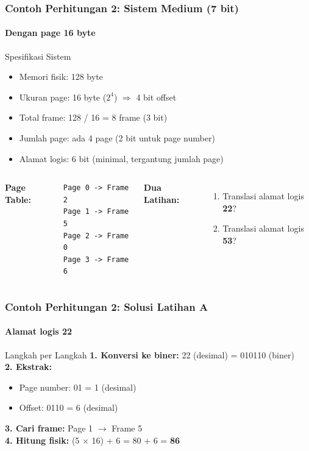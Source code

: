 \documentclass[t,aspectratio=169,xcolor=dvipsnames]{beamer}
\begin{document}
\begin{frame}[fragile]
    \frametitle{Contoh Perhitungan 2: Sistem Medium (7 bit)}
    \framesubtitle{Dengan page 16 byte}
    \scriptsize

    \begin{block}{Spesifikasi Sistem}
        \begin{itemize}
            \item Memori fisik: 128 byte
            \item Ukuran page: 16 byte ($2^4$) $\Rightarrow$ 4 bit offset
            \item Total frame: 128 / 16 = 8 frame (3 bit)
            \item Jumlah page: ada 4 page (2 bit untuk page number)
            \item Alamat logis: 6 bit (minimal, tergantung jumlah page)
        \end{itemize}
    \end{block}

    \vspace{0.2cm}
    \begin{columns}[T]
        \textbf{Page Table:}
        \begin{lstlisting}[basicstyle=\ttfamily\footnotesize,breaklines=true]
Page 0 -> Frame 2
Page 1 -> Frame 5
Page 2 -> Frame 0
Page 3 -> Frame 6
        \end{lstlisting}

        \textbf{Dua Latihan:}
        \begin{enumerate}
            \item Translasi alamat logis \textbf{22}?
            \item Translasi alamat logis \textbf{53}?
        \end{enumerate}
    \end{columns}
\end{frame}

\begin{frame}[fragile]
    \frametitle{Contoh Perhitungan 2: Solusi Latihan A}
    \framesubtitle{Alamat logis 22}
    \small

    \begin{block}{Langkah per Langkah}
        \textbf{1. Konversi ke biner:} 22 (desimal) = 010110 (biner) \\
        \textbf{2. Ekstrak:}
        \begin{itemize}
            \item Page number: 01 = 1 (desimal)
            \item Offset: 0110 = 6 (desimal)
        \end{itemize}
        \textbf{3. Cari frame:} Page 1 $\rightarrow$ Frame 5 \\
        \textbf{4. Hitung fisik:} (5 $\times$ 16) + 6 = 80 + 6 = \textbf{86}
    \end{block}
\end{frame}
\end{document}
